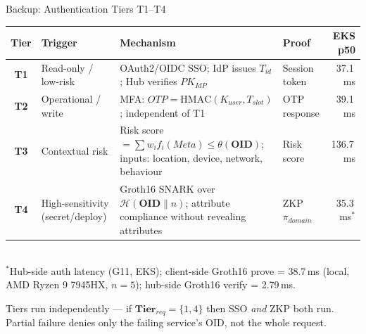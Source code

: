 \documentclass[aspectratio=169,11pt]{beamer}
\newcommand{\pinkbanner}[1]{%
  \begin{center}
  \begin{tcolorbox}[colback=fedacGray,colframe=fedacGray,
                    boxrule=0pt,arc=1mm,left=10pt,right=10pt,top=3pt,bottom=3pt,
                    width=0.96\linewidth,
                    borderline west={2pt}{0pt}{fedacTeal}]
  \footnotesize\color{fedacNavyD}#1
  \end{tcolorbox}
  \end{center}}
\begin{document}
{%
\begin{frame}[noframenumbering]{Backup: Authentication Tiers T1--T4}
\vspace{2pt}
\centering
\scriptsize
\setlength{\tabcolsep}{4pt}
\renewcommand{\arraystretch}{1.0}
\begin{tabular}{>{\bfseries}c p{2.2cm} p{4.0cm} p{2.0cm} r}
\toprule
\rowcolor{fedacGray}Tier & Trigger & Mechanism & Proof & EKS p50 \\
\midrule
T1 & Read-only / low-risk & OAuth2/OIDC SSO; IdP issues $T_{id}$; Hub verifies $PK_{IdP}$ & Session token & 37.1\,ms \\
T2 & Operational / write & MFA: $OTP = \mathrm{HMAC}(K_{user}, T_{slot})$; independent of T1 & OTP response & 39.1\,ms \\
T3 & Contextual risk & Risk score $= \sum w_i f_i(Meta) \le \theta(\mathbf{OID})$; inputs: location, device, network, behaviour & Risk score & 136.7\,ms \\
T4 & High-sensitivity (secret/deploy) & Groth16 SNARK over $\mathcal{H}(\mathbf{OID} \| n)$; attribute compliance without revealing attributes & ZKP $\pi_{domain}$ & 35.3\,ms$^*$ \\
\bottomrule
\end{tabular}\\[3pt]
{\tiny $^*$Hub-side auth latency (G11, EKS); client-side Groth16 prove = 38.7\,ms (local, AMD Ryzen 9 7945HX, $n{=}5$); hub-side Groth16 verify = 2.79\,ms.}\\[2pt]
\pinkbanner{Tiers run independently — if $\mathbf{Tier}_{req}{=}\{1,4\}$ then SSO \emph{and} ZKP both run. Partial failure denies only the failing service's OID, not the whole request.}
\end{frame}

}
\end{document}

